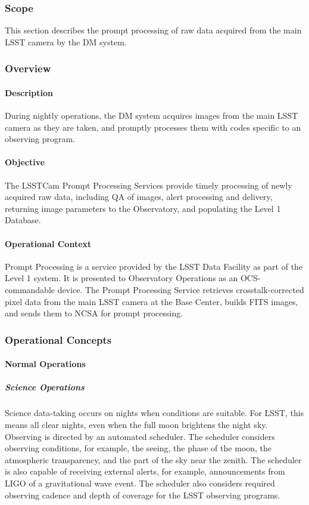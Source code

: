 ﻿\subsubsection{Scope}
This section describes the prompt processing of raw data acquired from the main 
LSST camera by the DM system.

\subsubsection{Overview}

\paragraph{Description}
During nightly operations, the DM system acquires images from the main LSST 
camera as they are taken, and promptly processes them with codes specific to an 
observing program. 

\paragraph{Objective}
The LSSTCam Prompt Processing Services provide timely processing of newly 
acquired raw data, including QA of images, alert processing and delivery, 
returning image parameters to the Observatory, and populating the Level 1 
Database.

\paragraph{Operational Context}
Prompt Processing is a service provided by the LSST Data Facility as part of the 
Level 1 system. It is presented to Observatory Operations as an OCS-commandable 
device. The Prompt Processing Service retrieves crosstalk-corrected pixel data 
from the main LSST camera at the Base Center, builds FITS images, and sends them 
to NCSA for prompt processing.

\subsubsection{Operational Concepts}

\paragraph{Normal Operations}

\subparagraph{Science Operations}

Science data-taking occurs on nights when conditions are suitable. For
LSST, this means all clear nights, even when the full moon brightens
the night sky. Observing is directed by an automated scheduler. The
scheduler considers observing conditions, for example, the seeing, the
phase of the moon, the atmospheric transparency, and the part of the
sky near the zenith. The scheduler is also capable of receiving
external alerts, for example, announcements from LIGO of a
gravitational wave event. The scheduler also considers required
observing cadence and depth of coverage for the LSST observing
programs.

